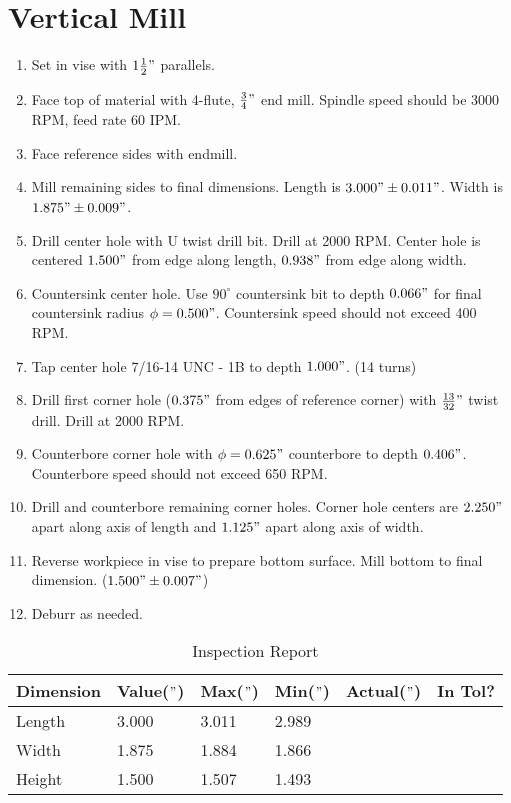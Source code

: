 \documentclass{article}
\begin{document}
\section*{Vertical Mill}
\begin{enumerate}[resume]
	\item Set in vise with $1 \frac{1}{2}"$ parallels.

	\item Face top of material with 4-flute, $\frac{3}{4}"$ end mill.  Spindle speed should be 3000 RPM, feed rate 60 IPM.

	\item Face reference sides with endmill.

	\item Mill remaining sides to final dimensions.  Length is $3.000" \pm 0.011"$.  Width is $1.875" \pm 0.009"$.

	\item Drill center hole with U twist drill bit.  Drill at 2000 RPM.  Center hole is centered $1.500"$ from edge along length, $0.938"$ from edge along width.

	\item Countersink center hole.  Use $90^\circ$ countersink bit to depth $0.066"$ for final countersink radius $\phi = 0.500"$.  Countersink speed should not exceed 400 RPM.

	\item Tap center hole 7/16-14 UNC - 1B to depth $1.000"$. (14 turns)

	\item Drill first corner hole ($0.375"$ from edges of reference corner) with $\frac{13}{32}"$ twist drill.  Drill at 2000 RPM.

	\item Counterbore corner hole with $\phi = 0.625"$ counterbore to depth $0.406"$.  Counterbore speed should not exceed 650 RPM.

	\item Drill and counterbore remaining corner holes.  Corner hole centers are $2.250"$ apart along axis of length and $1.125"$ apart along axis of width.

	\item Reverse workpiece in vise to prepare bottom surface.  Mill bottom to final dimension.  ($1.500" \pm 0.007"$)

	\item Deburr as needed.
\end{enumerate}

\newpage

\begin{table}[ht]
\centering
\caption{Inspection Report}
\renewcommand\arraystretch{3}
\begin{tabular}{l | m{2cm} | m{2cm} | m{2cm} | m{2cm} | m{2cm} |}
	Dimension & Value($"$) & Max($"$) & Min($"$) & Actual($"$) & In Tol? \\
	\hline
	Length & 3.000 & 3.011 & 2.989 && \\
	\hline
	Width & 1.875 & 1.884 & 1.866 && \\
	\hline
	Height & 1.500 & 1.507 & 1.493 && \\
	\hline
\end{tabular}
\end{table}
\end{document}
